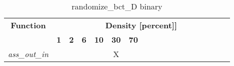 \begin{table}[h] \centering \begin{tabular}{|l|c|c|c|c|c|c|} \hline\multicolumn{1}{|c|}{\textbf{\large{Function}}} & \multicolumn{17}{c|}{\large{\textbf{Density [percent]]}}}\\\cline{2-18}  & \textbf{1} &  \textbf{2} &  \textbf{6} &  \textbf{10} &  \textbf{30} &  \textbf{70} \\ \hline   \textit{ass\_out\_in} &   &   &   &   & X &   \\ \hline \end{tabular}\caption{randomize\_bct\_D binary}\label{tab:my_label} \end{table}